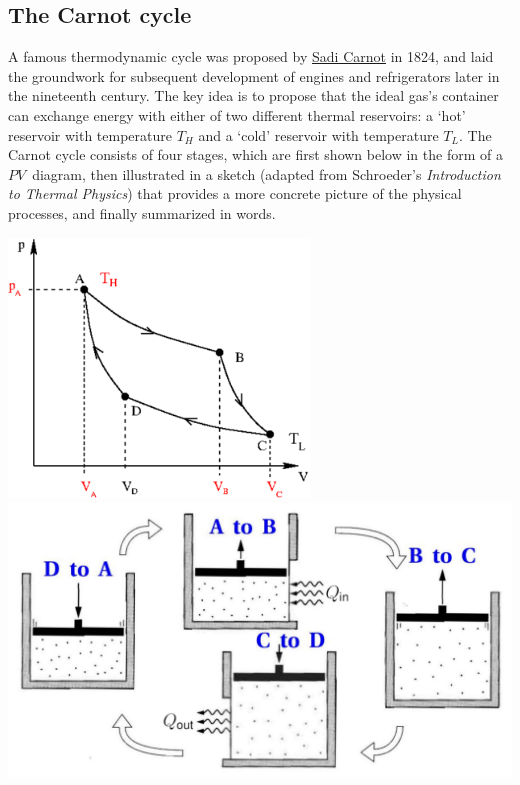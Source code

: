\subsection{The Carnot cycle}
A famous thermodynamic cycle was proposed by \href{https://en.wikipedia.org/wiki/Nicolas_Léonard_Sadi_Carnot}{Sadi Carnot} in 1824, and laid the groundwork for subsequent development of engines and refrigerators later in the nineteenth century.
The key idea is to propose that the ideal gas's container can exchange energy with either of two different thermal reservoirs: a `hot' reservoir with temperature $T_H$ and a `cold' reservoir with temperature $T_L$.
The Carnot cycle consists of four stages, which are first shown below in the form of a $PV$~diagram, then illustrated in a sketch (adapted from Schroeder's \textit{Introduction to Thermal Physics}) that provides a more concrete picture of the physical processes, and finally summarized in words.

\begin{center}
  \includegraphics[width=0.6\textwidth]{figs/unit05_carnot-PV.pdf} \\[36 pt]
  \includegraphics[width=\textwidth]{figs/unit05_carnot.pdf}
\end{center}

